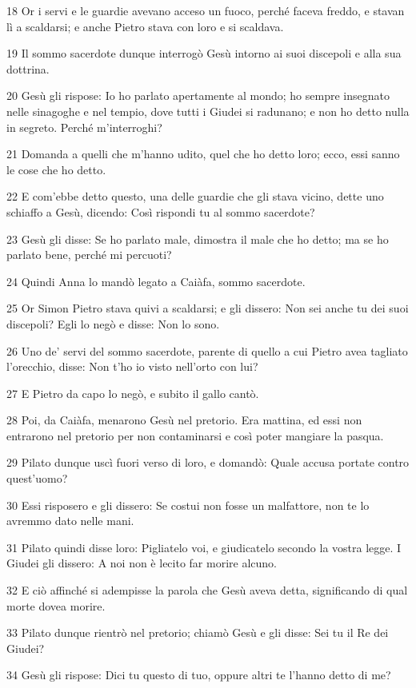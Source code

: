 \par 18 Or i servi e le guardie avevano acceso un fuoco, perché faceva freddo, e stavan lì a scaldarsi; e anche Pietro stava con loro e si scaldava.
\par 19 Il sommo sacerdote dunque interrogò Gesù intorno ai suoi discepoli e alla sua dottrina.
\par 20 Gesù gli rispose: Io ho parlato apertamente al mondo; ho sempre insegnato nelle sinagoghe e nel tempio, dove tutti i Giudei si radunano; e non ho detto nulla in segreto. Perché m'interroghi?
\par 21 Domanda a quelli che m'hanno udito, quel che ho detto loro; ecco, essi sanno le cose che ho detto.
\par 22 E com'ebbe detto questo, una delle guardie che gli stava vicino, dette uno schiaffo a Gesù, dicendo: Così rispondi tu al sommo sacerdote?
\par 23 Gesù gli disse: Se ho parlato male, dimostra il male che ho detto; ma se ho parlato bene, perché mi percuoti?
\par 24 Quindi Anna lo mandò legato a Caiàfa, sommo sacerdote.
\par 25 Or Simon Pietro stava quivi a scaldarsi; e gli dissero: Non sei anche tu dei suoi discepoli? Egli lo negò e disse: Non lo sono.
\par 26 Uno de' servi del sommo sacerdote, parente di quello a cui Pietro avea tagliato l'orecchio, disse: Non t'ho io visto nell'orto con lui?
\par 27 E Pietro da capo lo negò, e subito il gallo cantò.
\par 28 Poi, da Caiàfa, menarono Gesù nel pretorio. Era mattina, ed essi non entrarono nel pretorio per non contaminarsi e così poter mangiare la pasqua.
\par 29 Pilato dunque uscì fuori verso di loro, e domandò: Quale accusa portate contro quest'uomo?
\par 30 Essi risposero e gli dissero: Se costui non fosse un malfattore, non te lo avremmo dato nelle mani.
\par 31 Pilato quindi disse loro: Pigliatelo voi, e giudicatelo secondo la vostra legge. I Giudei gli dissero: A noi non è lecito far morire alcuno.
\par 32 E ciò affinché si adempisse la parola che Gesù aveva detta, significando di qual morte dovea morire.
\par 33 Pilato dunque rientrò nel pretorio; chiamò Gesù e gli disse: Sei tu il Re dei Giudei?
\par 34 Gesù gli rispose: Dici tu questo di tuo, oppure altri te l'hanno detto di me?
